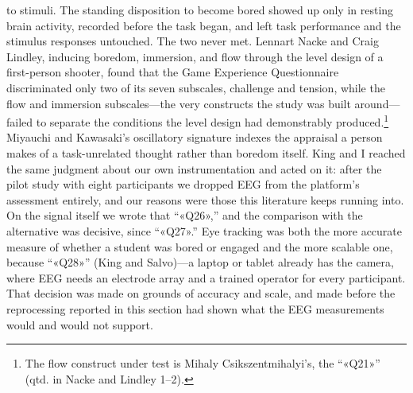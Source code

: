 to stimuli. The standing disposition to become bored showed up only in resting brain activity,
recorded before the task began, and left task performance and the stimulus responses
untouched. The two never met. Lennart Nacke and Craig Lindley, inducing boredom,
immersion, and flow through the level design of a first-person shooter, found that the Game
Experience Questionnaire discriminated only two of its seven subscales, challenge and tension,
while the flow and immersion subscales---the very constructs the study was built
around---failed to separate the conditions the level design had demonstrably
produced.\footnote{The flow construct under test is Mihaly Csikszentmihalyi's, the ``«Q21»''
(qtd. in Nacke and Lindley 1--2).} Miyauchi and Kawasaki's oscillatory signature indexes the
appraisal a person makes of a task-unrelated thought rather than boredom itself. King and I
reached the same judgment about our own instrumentation and acted on it: after the pilot study
with eight participants we dropped EEG from the platform's assessment entirely, and our
reasons were those this literature keeps running into. On the signal itself we wrote that
``«Q26»,'' and the comparison with the alternative was decisive, since ``«Q27».'' Eye tracking
was both the more accurate measure of whether a student was bored or engaged and the more
scalable one, because ``«Q28»'' (King and Salvo)---a laptop or tablet already has the camera,
where EEG needs an electrode array and a trained operator for every participant. That decision
was made on grounds of accuracy and scale, and made before the reprocessing reported in this
section had shown what the EEG measurements would and would not support.

